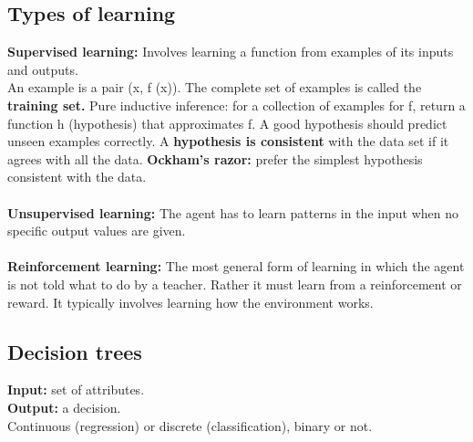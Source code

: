 \documentclass{article}
\begin{document}
\subsection{Types of learning}
\textbf{Supervised learning:} Involves learning a function from examples of its inputs and outputs.\\
An example is a pair (x, f (x)). The complete set of examples is called the \textbf{training set.} Pure inductive inference: for a collection of examples for f, return a function h (hypothesis) that approximates f.
A good hypothesis should predict unseen examples correctly. A \textbf{hypothesis is consistent} with the data set if it agrees with all the data.
\textbf{Ockham’s razor: }prefer the simplest hypothesis consistent with the data.\\\\

\textbf{Unsupervised learning: }The agent has to learn patterns in the input when no specific output values are given.\\\\
\textbf{Reinforcement learning: }The most general form of learning in which the agent is not told what to do by a teacher. Rather it must learn from a reinforcement or reward. It typically involves learning how the environment works.\\

\subsection{Decision trees}

\textbf{Input:} set of attributes.\\
\textbf{Output:} a decision.\\
Continuous (regression) or discrete (classification), binary or not.
\end{document}
